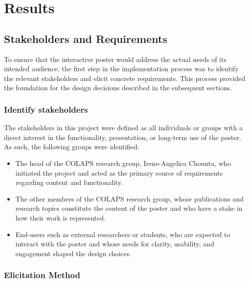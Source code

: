 \chapter{Results}
\label{sec:results}
\section{Stakeholders and Requirements}
To ensure that the interactive poster would address the actual needs of its intended audience, the first step in the implementation process was to identify the relevant stakeholders and elicit concrete requirements. This process provided the foundation for the design decisions described in the subsequent sections.

\subsection{Identify stakeholders}


The stakeholders in this project were defined as all individuals or groups with a direct interest in the functionality, presentation, or long-term use of the poster. As such, the following groups were identified:
\begin{itemize}
	\item The head of the COLAPS research group, Irene-Angelica Chounta, who initiated the project and acted as the primary source of requirements regarding content and functionality.
	\item The other members of the COLAPS research group, whose publications and research topics constitute the content of the poster and who have a stake in how their work is represented.
	\item End-users such as external researchers or students, who are expected to interact with the poster and whose needs for clarity, usability, and engagement shaped the design choices.
\end{itemize}

\subsection{Elicitation Method}

